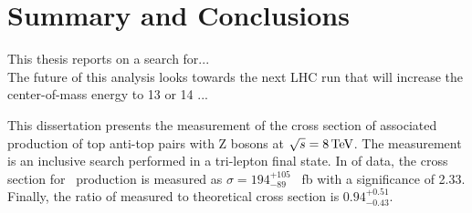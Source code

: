 \chapter{Summary and Conclusions}
\label {ch:conclusion}
This thesis reports on a search for... \\

The future of this analysis looks towards the next LHC run that will increase
the center-of-mass energy to 13 or 14 \TeV...




This dissertation presents the measurement of the cross section of associated production of top anti-top pairs with Z bosons at $\sqrt{s} = 8 \,\text{Te\hspace{-.08em}V}$. The measurement is an inclusive search performed in a tri-lepton final state. In \intLumi of data, the cross section for \ttZ \ production is measured as $\sigma=194 _{-89} ^{+105}$ \ fb with a significance of 2.33. Finally, the ratio of measured to theoretical cross section is $0.94_{-0.43} ^{+0.51}$.